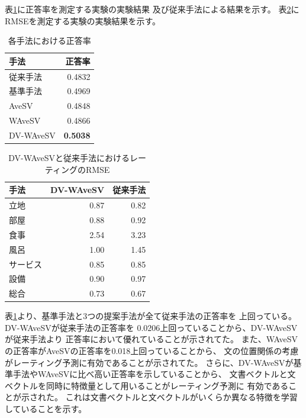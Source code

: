 \documentclass[twocolumn,a4paper]{ltjarticle}
\begin{document}
表\ref{tab:Accuracies}に正答率を測定する実験の実験結果
及び従来手法\cite{fujitani15}による結果を示す。
表\ref{tab:RMSEs}にRMSEを測定する実験の実験結果を示す。

\begin{table}[b]
  \caption{各手法における正答率}
  \centering
  \begin{tabular}{l | r} \label{tab:Accuracies}
    手法 & 正答率 \\
    \hline
    従来手法\cite{fujitani15}  & 0.4832 \\
    基準手法  & 0.4969 \\
    AveSV & 0.4848 \\
    WAveSV & 0.4866 \\
    DV-WAveSV & \textbf{0.5038} \\
  \end{tabular}
\end{table}

\begin{table}[b]
  \caption{DV-WAveSVと従来手法\cite{fujitani15}におけるレーティングのRMSE}
  \centering
  \begin{tabular}{l | r r} \label{tab:RMSEs}
    手法 & DV-WAveSV & 従来手法\cite{fujitani15} \\
    \hline
    立地      & 0.87 & 0.82 \\
    部屋      & 0.88 & 0.92 \\
    食事      & 2.54 & 3.23 \\
    風呂      & 1.00 & 1.45 \\
    サービス  & 0.85 & 0.85 \\
    設備      & 0.90 & 0.97 \\
    総合      & 0.73 & 0.67 \\
  \end{tabular}
\end{table}

表\ref{tab:Accuracies}より、基準手法と3つの提案手法が全て従来手法の正答率を
上回っている。
DV-WAveSVが従来手法\cite{fujitani15}の正答率を
0.0206上回っていることから、DV-WAveSVが従来手法\cite{fujitani15}より
正答率において優れていることが示されてた。
また、WAveSVの正答率がAveSVの正答率を0.018上回っていることから、
文の位置関係の考慮がレーティング予測に有効であることが示されてた。
さらに、DV-WAveSVが基準手法やWAveSVに比べ高い正答率を示していることから、
文書ベクトルと文ベクトルを同時に特徴量として用いることがレーティング予測に
有効であることが示された。
これは文書ベクトルと文ベクトルがいくらか異なる特徴を学習していることを示す。
\end{document}
